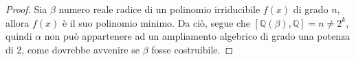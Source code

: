\begin{proof}
Sia $\beta$ numero reale radice di un polinomio irriducibile $f(x)$ di grado $n$, allora $f(x)$ è il suo polinomio minimo. Da ciò, segue che $[\mathbb{Q}(\beta), \mathbb{Q}] = n \neq 2^k$, quindi $\alpha$ non può appartenere ad un ampliamento algebrico di grado una potenza di 2, come dovrebbe avvenire se $\beta$ fosse costruibile.
\end{proof}











